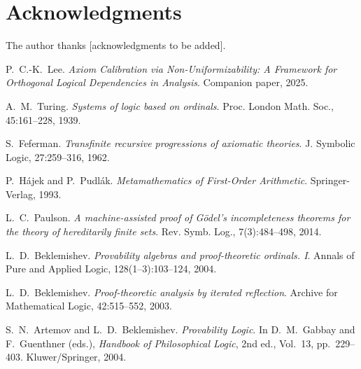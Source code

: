 \documentclass[11pt]{article}
\begin{document}
\section*{Acknowledgments}

The author thanks [acknowledgments to be added].

\begin{thebibliography}{10}

P.~C.-K.~Lee.
\emph{Axiom Calibration via Non-Uniformizability: A Framework for Orthogonal Logical Dependencies in Analysis}.
Companion paper, 2025.

A.~M.~Turing.
\emph{Systems of logic based on ordinals}.
Proc. London Math. Soc., 45:161--228, 1939.

S.~Feferman.
\emph{Transfinite recursive progressions of axiomatic theories}.
J. Symbolic Logic, 27:259--316, 1962.

P.~Hájek and P.~Pudlák.
\emph{Metamathematics of First-Order Arithmetic}.
Springer-Verlag, 1993.

L.~C.~Paulson.
\emph{A machine-assisted proof of Gödel's incompleteness theorems for the theory of hereditarily finite sets}.
Rev. Symb. Log., 7(3):484--498, 2014.

L.~D.~Beklemishev.
\emph{Provability algebras and proof-theoretic ordinals. I}.
Annals of Pure and Applied Logic, 128(1--3):103--124, 2004.

L.~D.~Beklemishev.
\emph{Proof-theoretic analysis by iterated reflection}.
Archive for Mathematical Logic, 42:515--552, 2003.

S.~N.~Artemov and L.~D.~Beklemishev.
\emph{Provability Logic}.
In D.~M.~Gabbay and F.~Guenthner (eds.), \emph{Handbook of Philosophical Logic}, 2nd ed., Vol.~13, pp.~229--403.
Kluwer/Springer, 2004.

\end{thebibliography}
\end{document}

